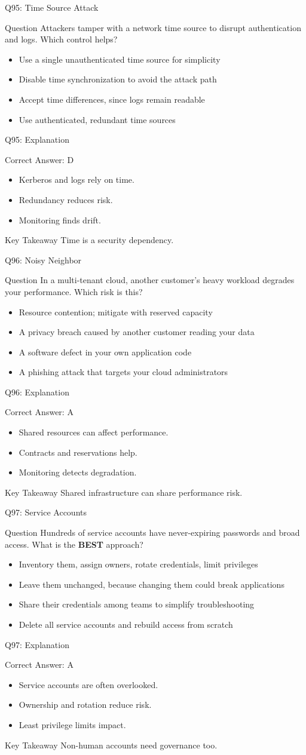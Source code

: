 \documentclass[aspectratio=169]{beamer}
\newcommand{\hq}[7]{%
	\begin{frame}{Q#1: #2}
		\begin{block}{Question}
			#3
		\end{block}
		\begin{itemize}
			#4
		\end{itemize}
	\end{frame}
	\begin{frame}{Q#1: Explanation}
		\begin{block}{Correct Answer: #5}
			\begin{itemize}
				#6
			\end{itemize}
		\end{block}
		\begin{alertblock}{Key Takeaway}
			#7
		\end{alertblock}
	\end{frame}
}
\begin{document}
	\hq{95}{Time Source Attack}
	{Attackers tamper with a network time source to disrupt authentication and logs. Which control helps?}
	{\item[\textbf{(A)}] Use a single unauthenticated time source for simplicity
		\item[\textbf{(B)}] Disable time synchronization to avoid the attack path
		\item[\textbf{(C)}] Accept time differences, since logs remain readable
		\item[\textbf{(D)}] Use authenticated, redundant time sources}
	{D}
	{\item Kerberos and logs rely on time.
		\item Redundancy reduces risk.
		\item Monitoring finds drift.}
	{Time is a security dependency.}

	\hq{96}{Noisy Neighbor}
	{In a multi-tenant cloud, another customer's heavy workload degrades your performance. Which risk is this?}
	{\item[\textbf{(A)}] Resource contention; mitigate with reserved capacity
		\item[\textbf{(B)}] A privacy breach caused by another customer reading your data
		\item[\textbf{(C)}] A software defect in your own application code
		\item[\textbf{(D)}] A phishing attack that targets your cloud administrators}
	{A}
	{\item Shared resources can affect performance.
		\item Contracts and reservations help.
		\item Monitoring detects degradation.}
	{Shared infrastructure can share performance risk.}

	\hq{97}{Service Accounts}
	{Hundreds of service accounts have never-expiring passwords and broad access. What is the \textbf{BEST} approach?}
	{\item[\textbf{(A)}] Inventory them, assign owners, rotate credentials, limit privileges
		\item[\textbf{(B)}] Leave them unchanged, because changing them could break applications
		\item[\textbf{(C)}] Share their credentials among teams to simplify troubleshooting
		\item[\textbf{(D)}] Delete all service accounts and rebuild access from scratch}
	{A}
	{\item Service accounts are often overlooked.
		\item Ownership and rotation reduce risk.
		\item Least privilege limits impact.}
	{Non-human accounts need governance too.}
\end{document}
